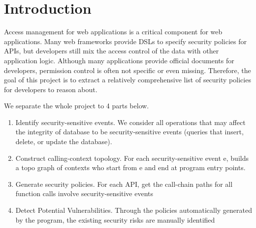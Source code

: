 \section{Introduction}%


Access management for web applications is a critical component for web
applications.
Many web frameworks provide DSLs to specify security policies for APIs, but
developers still mix the access control of the data with other application
logic.
Although many applications provide official documents for developers,
permission control is often not specific or even missing.
%
Therefore, the goal of this project is to extract a relatively comprehensive
list of security policies for developers to reason about.

We separate the whole project to 4 parts below.
\begin{enumerate}
  \item Identify security-sensitive events. We consider all operations that may
        affect the integrity of database to be security-sensitive events
        (queries that insert, delete, or update the database).

  \item Construct calling-context topology. For each security-sensitive event e,
        builds a topo graph of contexts who start from e and end at program
        entry points.

  \item Generate security policies. For each API,  get the call-chain paths for
        all function calls involve security-sensitive events

  \item Detect Potential Vulnerabilities. Through the policies automatically
        generated by the program, the existing security risks are manually
        identified
\end{enumerate}

